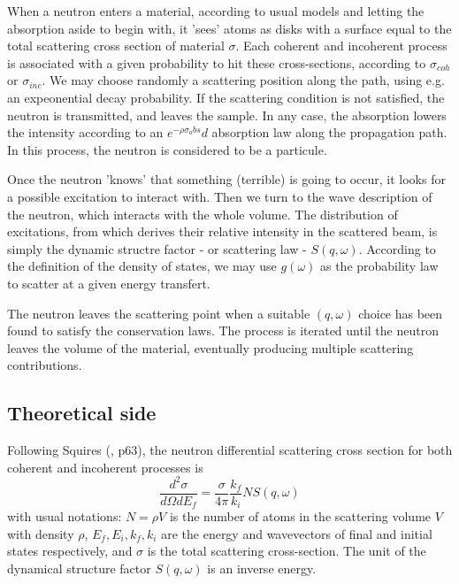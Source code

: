 When a neutron enters a material, according to usual models and letting the absorption aside to begin with, it 'sees' atoms as disks with a surface equal to the total scattering cross section of material $\sigma$. Each coherent and incoherent process is associated with a given probability to hit these cross-sections, according to $\sigma_{coh}$ or $\sigma_{inc}$. We may choose randomly a scattering position along the path, using e.g. an expeonential decay probability. If the scattering condition is not satisfied, the neutron is transmitted, and leaves the sample. In any case, the absorption lowers the intensity according to an $e^{-\rho \sigma_abs} d$ absorption law along the propagation path. In this process, the neutron is considered to be a particule.

Once the neutron 'knows' that something (terrible) is going to occur, it looks for a possible excitation to interact with. Then we turn to the wave description of the neutron, which interacts with the whole volume. The distribution of excitations, from which derives their relative intensity in the scattered beam, is simply the dynamic structre factor - or scattering law - $S(q,\omega)$. According to the definition of the density of states, we may use $g(\omega)$ as the probability law to scatter at a given energy transfert.

The neutron leaves the scattering point when a suitable $(q, \omega)$ choice has been found to satisfy the conservation laws. The process is iterated until the neutron leaves the volume of the material, eventually producing multiple scattering contributions.

\subsection{Theoretical side}

Following Squires (\cite{squires}, p63), the neutron differential scattering cross section for both coherent and incoherent processes is
\begin{equation}
\frac{d^2\sigma}{d\Omega dE_f} = \frac{\sigma}{4\pi}\frac{k_f}{k_i} N S(q, \omega)
\end{equation}
with usual notations: $N=\rho V$ is the number of atoms in the scattering volume $V$ with density $\rho$, $E_f, E_i, k_f, k_i$ are the energy and wavevectors of final and initial states respectively, and $\sigma$ is the total scattering cross-section. The unit of the dynamical structure factor $S(q,\omega)$ is an inverse energy.

